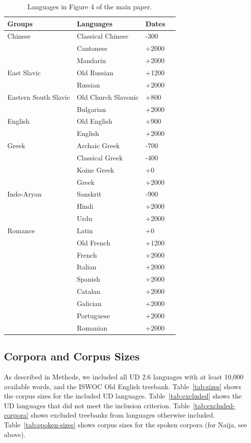 \documentclass[11pt,a4paper]{article}
\begin{document}
\begin{table}
\begin{longtable}{l|lll} \hline
Groups & Languages & Dates \\ \hline\hline
Chinese & Classical Chinese & -300  \\
& Cantonese & +2000\\ 
& Mandarin & +2000 \\ \hline
East Slavic & Old Russian & +1200 \\
& Russian & +2000 \\ \hline
Eastern South Slavic & Old Church Slavonic & +800 \\
& Bulgarian  & +2000\\ \hline
English & Old English & +900 \\
& English  & +2000\\ \hline
Greek & Archaic Greek & -700 \\
      & Classical Greek & -400 \\
      & Koine Greek & +0\\
& Greek  & +2000\\ \hline
Indo-Aryan & Sanskrit & -900 \\
& Hindi  & +2000\\
& Urdu  & +2000\\ \hline
Romance & Latin &+0  \\
& Old French &+1200\\
& French  & +2000\\
& Italian & +2000\\
& Spanish & +2000\\
& Catalan & +2000\\
& Galician & +2000\\
& Portuguese & +2000\\
& Romanian & +2000\\ \hline
\end{longtable}
	\caption{Languages in Figure 4 of the main paper.}
\label{tab:traj}
\end{table}

\subsection{Corpora and Corpus Sizes}

As described in Methods, we included all UD 2.6 languages with at least 10,000 available words, and the ISWOC Old English treebank.
Table~\ref{tab:sizes} shows the corpus sizes for the included UD languages.
Table~\ref{tab:excluded} shows the UD languages that did not meet the inclusion criterion.
Table~\ref{tab:excluded-corpora} shows excluded treebanks from languages otherwise included.
Table~\ref{tab:spoken-sizes} shows corpus sizes for the spoken corpora (for Naija, see above).
\end{document}
